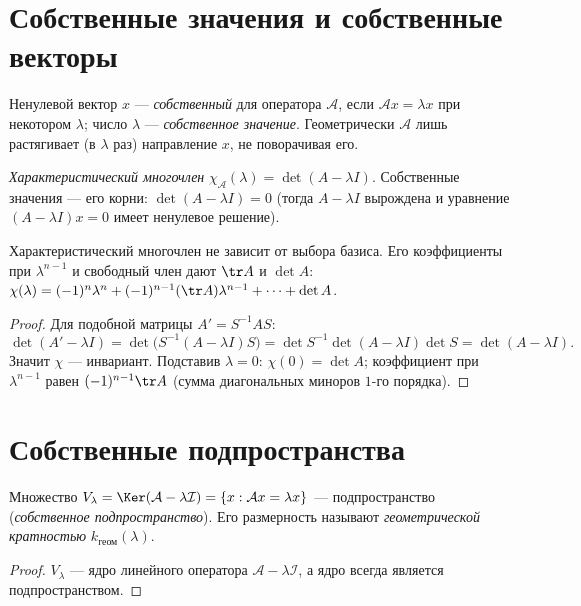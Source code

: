 \section{Собственные значения и собственные векторы}

\begin{definition}
Ненулевой вектор $x$ — \emph{собственный} для оператора $\mathcal A$, если
$\mathcal Ax=\lambda x$ при некотором $\lambda$; число $\lambda$ — \emph{собственное значение}.
Геометрически $\mathcal A$ лишь растягивает (в $\lambda$ раз) направление $x$, не поворачивая его.
\end{definition}

\begin{definition}
\emph{Характеристический многочлен} $\chi_{\mathcal A}(\lambda)=\det(A-\lambda I)$. Собственные
значения — его корни: $\det(A-\lambda I)=0$ (тогда $A-\lambda I$ вырождена и уравнение
$(A-\lambda I)x=0$ имеет ненулевое решение).
\end{definition}

\begin{theorem}
Характеристический многочлен не зависит от выбора базиса. Его коэффициенты при $\lambda^{n-1}$ и
свободный член дают $\tr A$ и $\det A$: $\chi(\lambda)=(-1)^n\lambda^n+(-1)^{n-1}(\tr A)\lambda^{n-1}+\dots+\det A$.
\end{theorem}

\begin{proof}
Для подобной матрицы $A'=S^{-1}AS$:
\[
  \det(A'-\lambda I)=\det\!\bigl(S^{-1}(A-\lambda I)S\bigr)=\det S^{-1}\det(A-\lambda I)\det S=\det(A-\lambda I).
\]
Значит $\chi$ — инвариант. Подставив $\lambda=0$: $\chi(0)=\det A$; коэффициент при
$\lambda^{n-1}$ равен $(-1)^{n-1}\tr A$ (сумма диагональных миноров $1$-го порядка).
\end{proof}

\section{Собственные подпространства}

\begin{theorem}
Множество $V_\lambda=\Ker(\mathcal A-\lambda\mathcal I)=\{x:\mathcal Ax=\lambda x\}$ — подпространство
(\emph{собственное подпространство}). Его размерность называют \emph{геометрической кратностью}
$k_{\text{геом}}(\lambda)$.
\end{theorem}

\begin{proof}
$V_\lambda$ — ядро линейного оператора $\mathcal A-\lambda\mathcal I$, а ядро всегда является
подпространством.
\end{proof}

